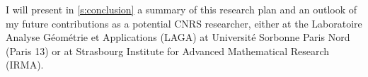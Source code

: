 I will present in \cref{s:conclusion} a summary of this research plan and an outlook of my future contributions as a potential CNRS researcher, either at the Laboratoire Analyse G\'eom\'etrie et Applications (LAGA) at Universit\'e Sorbonne Paris Nord (Paris 13) or at Strasbourg Institute for Advanced Mathematical Research (IRMA).